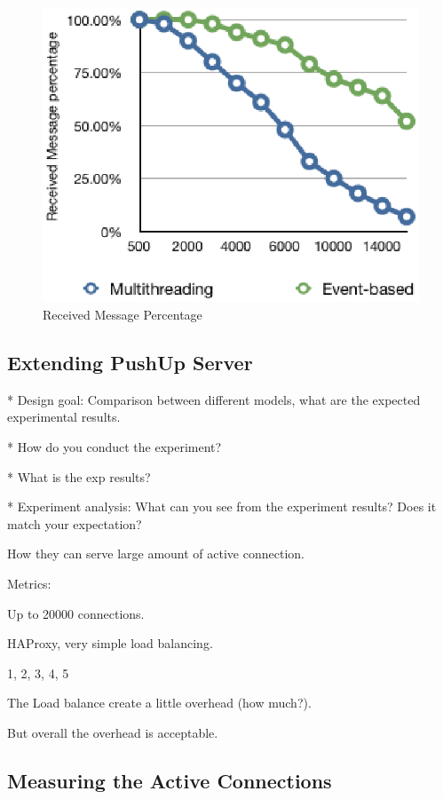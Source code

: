 \begin{figure}[htb!]
\centering%
    \includegraphics[scale=0.70]{figures/et_rate.eps}
    \caption{Received Message Percentage}
    \label{fig:et_rate}
\end{figure}


\subsection{Extending PushUp Server\\}

* Design goal: Comparison between different models, what are the expected experimental results.

* How do you conduct the experiment?

* What is the exp results?

* Experiment analysis: What can you see from the experiment results? Does it match your expectation?


How they can serve large amount of active connection.

Metrics:

Up to 20000 connections.

HAProxy, very simple load balancing.

1, 2, 3, 4, 5

The Load balance create a little overhead (how much?).

But overall the overhead is acceptable.




\subsection{Measuring the Active Connections\\}

